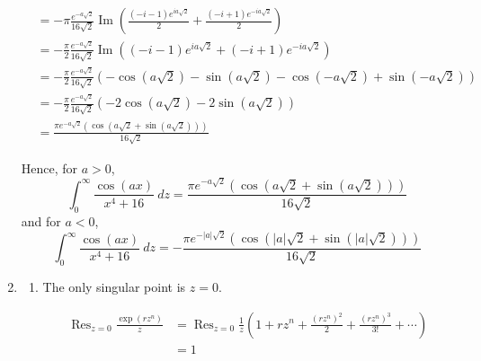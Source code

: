 \documentclass{article}
\newcommand{\paren}[1]{\left(#1\right)}
\DeclareMathOperator{\imm}{Im}
\DeclareMathOperator{\Res}{Res}
\begin{document}
\begin{enumerate}
\begin{align*}
    &= -\pi \frac{e^{-a\sqrt{2}}}{16\sqrt{2}} \imm\paren{\frac{(-i-1)e^{ia\sqrt{2}}}{2} + \frac{(-i+1)e^{-ia\sqrt{2}}}{2}} \\
    &= -\frac{\pi}{2} \frac{e^{-a\sqrt{2}}}{16\sqrt{2}} \imm\paren{ (-i-1)e^{ia\sqrt{2}} + (-i+1)e^{-ia\sqrt{2}} } \\
    &= -\frac{\pi}{2} \frac{e^{-a\sqrt{2}}}{16\sqrt{2}} \paren{ -\cos(a\sqrt{2})  - \sin(a\sqrt{2}) - \cos(-a\sqrt{2}) + \sin(-a\sqrt{2})} \\
    &= -\frac{\pi}{2} \frac{e^{-a\sqrt{2}}}{16\sqrt{2}} \paren{ -2\cos(a\sqrt{2})  - 2\sin(a\sqrt{2})} \\
    &= \frac{\pi e^{-a\sqrt{2}}(\cos(a\sqrt{2} + \sin(a\sqrt{2})))}{16\sqrt{2}}
\end{align*}

Hence, for $a>0$,
\[
\int_{0}^\infty \frac{\cos (ax)}{x^4 + 16}\ dz = \frac{\pi e^{-a\sqrt{2}}(\cos(a\sqrt{2} + \sin(a\sqrt{2})))}{16\sqrt{2}}
\]
and for $a<0$,
\[
\int_{0}^\infty \frac{\cos (ax)}{x^4 + 16}\ dz = -\frac{\pi e^{-|a|\sqrt{2}}(\cos(|a|\sqrt{2} + \sin(|a|\sqrt{2})))}{16\sqrt{2}}
\]
\item
\begin{enumerate}
\item The only singular point is $z=0$.

\begin{align*}
\Res_{z=0} \frac{\exp(rz^n)}{z} &= \Res_{z=0} \frac{1}{z} (1 + rz^n + \frac{(rz^n)^2}{2} + \frac{(rz^n)^3}{3!} + \cdots) \\
    &= 1
\end{align*}


\end{enumerate}
\end{enumerate}
\end{document}
